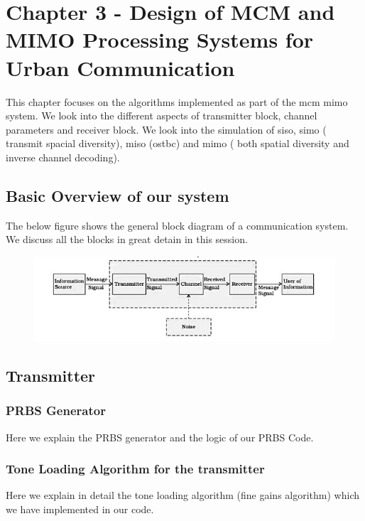 \chapter{Chapter 3 - Design of MCM and MIMO Processing Systems for Urban Communication}

This chapter focuses on the algorithms implemented as part of the \acrshort{mcm} \acrshort{mimo} system. We look into the different aspects of transmitter block, channel parameters and receiver block. We look into the simulation of \acrshort{siso}, \acrshort{simo} ( transmit \gls{spacial diversity}), \acrshort{miso} (\acrshort{ostbc}) and \acrshort{mimo} ( both \gls{spatial diversity} and inverse channel decoding). 
 
\section{Basic Overview of our system}

The below figure shows the general block diagram of a communication system. We discuss all the blocks in great detain in this session.

\begin{figure}[!htbp]
\centering
\includegraphics[scale=1]{Chapter 3/Figures/Block system}
\label{fig:general block digram}
\end{figure}

\section{Transmitter}

\subsection{PRBS Generator}
Here we explain the PRBS generator and the logic of our PRBS Code.

\subsection{Tone Loading Algorithm for the transmitter}
Here we explain in detail the tone loading algorithm (fine gains algorithm) which we have implemented in our code.

